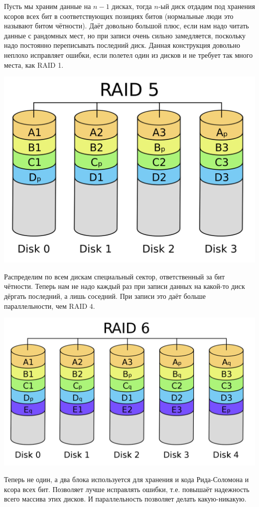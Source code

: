 \documentclass[12pt, a4paper]{article}
\begin{document}
Пусть мы храним данные на $n-1$ дисках, тогда $n$-ый диск отдадим под хранения ксоров всех бит в соответствующих позициях битов (нормальные люди это называют битом чётности). Даёт довольно большой плюс, если нам надо читать данные с рандомных мест, но при записи очень сильно замедляется, поскольку надо постоянно переписывать последний диск. Данная конструкция довольно неплохо исправляет ошибки, если полетел один из дисков и не требует так много места, как RAID 1.

\begin{center}
\includegraphics[scale=0.13]{./images/RAID5.png}
\end{center}

Распределим по всем дискам специальный сектор, ответственный за бит чётности. Теперь нам не надо каждый раз при записи данных на какой-то диск дёргать последний, а лишь соседний. При записи это даёт больше параллельности, чем RAID $4$.

\begin{center}
\includegraphics[scale=0.11]{./images/RAID6.png}
\end{center}

Теперь не один, а два блока используется для хранения и кода Рида-Соломона и ксора всех бит. Позволяет лучше исправлять ошибки, т.е. повышаёт надежность всего массива этих дисков. И параллельность позволяет делать какую-никакую.
\end{document}

